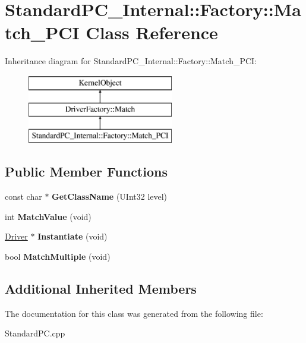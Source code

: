 \hypertarget{class_standard_p_c___internal_1_1_factory_1_1_match___p_c_i}{}\section{Standard\+P\+C\+\_\+\+Internal\+:\+:Factory\+:\+:Match\+\_\+\+P\+CI Class Reference}
\label{class_standard_p_c___internal_1_1_factory_1_1_match___p_c_i}
Inheritance diagram for Standard\+P\+C\+\_\+\+Internal\+:\+:Factory\+:\+:Match\+\_\+\+P\+CI\+:\begin{figure}[H]
\begin{center}
\leavevmode
\includegraphics[height=3.000000cm]{class_standard_p_c___internal_1_1_factory_1_1_match___p_c_i}
\end{center}
\end{figure}
\subsection*{Public Member Functions}
\begin{DoxyCompactItemize}
\item 
\mbox{\label{class_standard_p_c___internal_1_1_factory_1_1_match___p_c_i_ac3f58b990a94156e437e8eb8a98bb0ef}} 
const char $\ast$ {\bfseries Get\+Class\+Name} (U\+Int32 level)
\item 
\mbox{\label{class_standard_p_c___internal_1_1_factory_1_1_match___p_c_i_ad9b4b2243ffb18847ac1f1c044c25b08}} 
int {\bfseries Match\+Value} (void)
\item 
\mbox{\label{class_standard_p_c___internal_1_1_factory_1_1_match___p_c_i_a9f5ff785ac46ef3d2d8d9b5a848b59a4}} 
\hyperlink{class_driver}{Driver} $\ast$ {\bfseries Instantiate} (void)
\item 
\mbox{\label{class_standard_p_c___internal_1_1_factory_1_1_match___p_c_i_aa07b116feef858b277be5eb4822ccab4}} 
bool {\bfseries Match\+Multiple} (void)
\end{DoxyCompactItemize}
\subsection*{Additional Inherited Members}


The documentation for this class was generated from the following file\+:\begin{DoxyCompactItemize}
\item 
Standard\+P\+C.\+cpp\end{DoxyCompactItemize}
